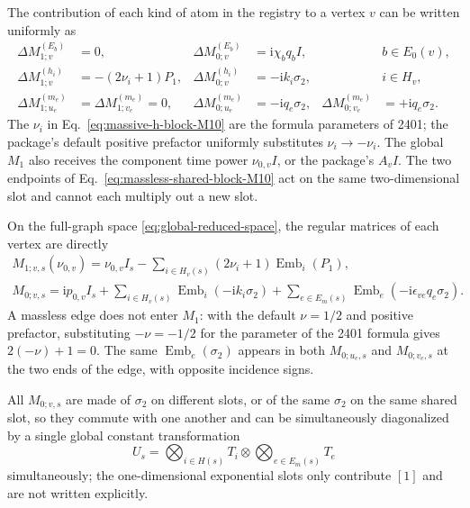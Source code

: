 \documentclass[11pt,a4paper]{article}
\newcommand{\ii}{\mathrm i}
\newcommand{\Emb}{\operatorname{Emb}}
\begin{document}
The contribution of each kind of atom in the registry to a vertex $v$ can be written uniformly as
\begin{align}
 \Delta M_{1;v}^{(E_b)}&=0,
 &\Delta M_{0;v}^{(E_b)}&=\ii\chi_bq_b I,
 &&b\in E_0(v),
 \label{eq:phase-block-M10}\\
 \Delta M_{1;v}^{(h_i)}&=-(2\nu_i+1)P_1,
 &\Delta M_{0;v}^{(h_i)}&=-\ii k_i\sigma_2,
 &&i\in H_v,
 \label{eq:massive-h-block-M10}\\
 \Delta M_{1;u_e}^{(m_e)}&=\Delta M_{1;v_e}^{(m_e)}=0,
 &\Delta M_{0;u_e}^{(m_e)}&=-\ii q_e\sigma_2,
 &\Delta M_{0;v_e}^{(m_e)}&=+\ii q_e\sigma_2.
 \label{eq:massless-shared-block-M10}
\end{align}
The $\nu_i$ in Eq.~\eqref{eq:massive-h-block-M10} are the formula parameters of 2401; the package's default positive prefactor uniformly substitutes $\nu_i\to-\nu_i$. The global $M_1$ also receives the component time power $\nu_{0,v}I$, or the package's $A_vI$. The two endpoints of Eq.~\eqref{eq:massless-shared-block-M10} act on the same two-dimensional slot and cannot each multiply out a new slot.

On the full-graph space \eqref{eq:global-reduced-space}, the regular matrices of each vertex are directly
\begin{align}
 \boxed{
 M_{1;v,s}(\nu_{0,v})
 =\nu_{0,v}I_s
 -\sum_{i\in H_v(s)}(2\nu_i+1)\Emb_i(P_1),
 }
 \label{eq:global-M1}\\
 \boxed{
 M_{0;v,s}
 =\ii p_{0,v}I_s
 +\sum_{i\in H_v(s)}\Emb_i(-\ii k_i\sigma_2)
 +\sum_{e\in E_m(s)}\Emb_e(-\ii\epsilon_{ve}q_e\sigma_2).
 }
 \label{eq:global-M0}
\end{align}
A massless edge does not enter $M_1$: with the default $\nu=1/2$ and positive prefactor, substituting $-\nu=-1/2$ for the parameter of the 2401 formula gives $2(-\nu)+1=0$. The same $\Emb_e(\sigma_2)$ appears in both $M_{0;u_e,s}$ and $M_{0;v_e,s}$ at the two ends of the edge, with opposite incidence signs.

All $M_{0;v,s}$ are made of $\sigma_2$ on different slots, or of the same $\sigma_2$ on the same shared slot, so they commute with one another and can be simultaneously diagonalized by a single global constant transformation
\begin{equation}
 U_s
 =\bigotimes_{i\in H(s)}T_i
 \otimes\bigotimes_{e\in E_m(s)}T_e
 \label{eq:global-T}
\end{equation}
simultaneously; the one-dimensional exponential slots only contribute $[1]$ and are not written explicitly.
\end{document}
